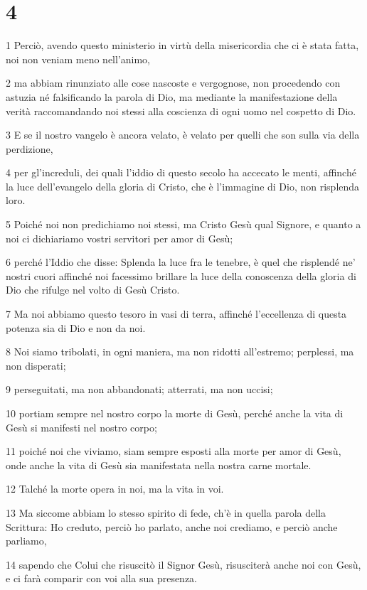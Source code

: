 \chapter{4}

\par 1 Perciò, avendo questo ministerio in virtù della misericordia che ci è stata fatta, noi non veniam meno nell'animo,
\par 2 ma abbiam rinunziato alle cose nascoste e vergognose, non procedendo con astuzia né falsificando la parola di Dio, ma mediante la manifestazione della verità raccomandando noi stessi alla coscienza di ogni uomo nel cospetto di Dio.
\par 3 E se il nostro vangelo è ancora velato, è velato per quelli che son sulla via della perdizione,
\par 4 per gl'increduli, dei quali l'iddio di questo secolo ha accecato le menti, affinché la luce dell'evangelo della gloria di Cristo, che è l'immagine di Dio, non risplenda loro.
\par 5 Poiché noi non predichiamo noi stessi, ma Cristo Gesù qual Signore, e quanto a noi ci dichiariamo vostri servitori per amor di Gesù;
\par 6 perché l'Iddio che disse: Splenda la luce fra le tenebre, è quel che risplendé ne' nostri cuori affinché noi facessimo brillare la luce della conoscenza della gloria di Dio che rifulge nel volto di Gesù Cristo.
\par 7 Ma noi abbiamo questo tesoro in vasi di terra, affinché l'eccellenza di questa potenza sia di Dio e non da noi.
\par 8 Noi siamo tribolati, in ogni maniera, ma non ridotti all'estremo; perplessi, ma non disperati;
\par 9 perseguitati, ma non abbandonati; atterrati, ma non uccisi;
\par 10 portiam sempre nel nostro corpo la morte di Gesù, perché anche la vita di Gesù si manifesti nel nostro corpo;
\par 11 poiché noi che viviamo, siam sempre esposti alla morte per amor di Gesù, onde anche la vita di Gesù sia manifestata nella nostra carne mortale.
\par 12 Talché la morte opera in noi, ma la vita in voi.
\par 13 Ma siccome abbiam lo stesso spirito di fede, ch'è in quella parola della Scrittura: Ho creduto, perciò ho parlato, anche noi crediamo, e perciò anche parliamo,
\par 14 sapendo che Colui che risuscitò il Signor Gesù, risusciterà anche noi con Gesù, e ci farà comparir con voi alla sua presenza.
